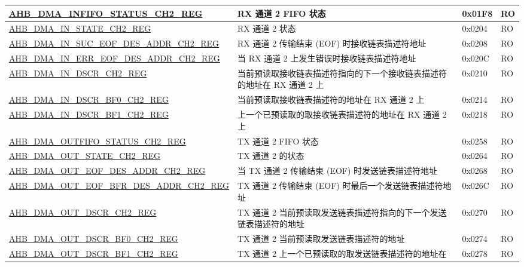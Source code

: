\begin{longtable}{ | p{8cm} | p{8cm} | p{1.3cm} | p{1.5cm} | }
\hyperref[regdesc:AHBDMAINFIFOSTATUSCHNREG]{AHB\_DMA\_INFIFO\_STATUS\_CH2\_REG} & RX 通道 2 FIFO 状态 & 0x01F8 & RO \\ \hline
\hyperref[regdesc:AHBDMAINSTATECHNREG]{AHB\_DMA\_IN\_STATE\_CH2\_REG} & RX 通道 2 状态 & 0x0204 & RO \\ \hline
\hyperref[regdesc:AHBDMAINSUCEOFDESADDRCHNREG]{AHB\_DMA\_IN\_SUC\_EOF\_DES\_ADDR\_CH2\_REG} & RX 通道 2 传输结束 (EOF) 时接收链表描述符地址 & 0x0208 & RO \\ \hline
\hyperref[regdesc:AHBDMAINERREOFDESADDRCHNREG]{AHB\_DMA\_IN\_ERR\_EOF\_DES\_ADDR\_CH2\_REG} & 当 RX 通道 2 上发生错误时接收链表描述符地址 & 0x020C & RO \\ \hline
\hyperref[regdesc:AHBDMAINDSCRCHNREG]{AHB\_DMA\_IN\_DSCR\_CH2\_REG} & 当前预读取接收链表描述符指向的下一个接收链表描述符的地址在 RX 通道 2 上 & 0x0210 & RO \\ \hline
\hyperref[regdesc:AHBDMAINDSCRBF0CHNREG]{AHB\_DMA\_IN\_DSCR\_BF0\_CH2\_REG} & 当前预读取接收链表描述符的地址在 RX 通道 2 上 & 0x0214 & RO \\ \hline
\hyperref[regdesc:AHBDMAINDSCRBF1CHNREG]{AHB\_DMA\_IN\_DSCR\_BF1\_CH2\_REG} & 上一个已预读取的取接收链表描述符的地址在 RX 通道 2 上 & 0x0218 & RO \\ \hline
\hyperref[regdesc:AHBDMAOUTFIFOSTATUSCHNREG]{AHB\_DMA\_OUTFIFO\_STATUS\_CH2\_REG} & TX 通道 2 FIFO 状态 & 0x0258 & RO \\ \hline
\hyperref[regdesc:AHBDMAOUTSTATECHNREG]{AHB\_DMA\_OUT\_STATE\_CH2\_REG} & TX 通道 2 的状态 & 0x0264 & RO \\ \hline
\hyperref[regdesc:AHBDMAOUTEOFDESADDRCHNREG]{AHB\_DMA\_OUT\_EOF\_DES\_ADDR\_CH2\_REG} & 当 TX 通道 2 传输结束 (EOF) 时发送链表描述符地址 & 0x0268 & RO \\ \hline
\hyperref[regdesc:AHBDMAOUTEOFBFRDESADDRCHNREG]{AHB\_DMA\_OUT\_EOF\_BFR\_DES\_ADDR\_CH2\_REG} & TX 通道 2 传输结束 (EOF) 时最后一个发送链表描述符地址 & 0x026C & RO \\ \hline
\hyperref[regdesc:AHBDMAOUTDSCRCHNREG]{AHB\_DMA\_OUT\_DSCR\_CH2\_REG} & TX 通道 2 当前预读取发送链表描述符指向的下一个发送链表描述符的地址 & 0x0270 & RO \\ \hline
\hyperref[regdesc:AHBDMAOUTDSCRBF0CHNREG]{AHB\_DMA\_OUT\_DSCR\_BF0\_CH2\_REG} & TX 通道 2 当前预读取发送链表描述符的地址 & 0x0274 & RO \\ \hline
\hyperref[regdesc:AHBDMAOUTDSCRBF1CHNREG]{AHB\_DMA\_OUT\_DSCR\_BF1\_CH2\_REG} & TX 通道 2 上一个已预读取的取发送链表描述符的地址在 & 0x0278 & RO \\ \hline

\end{longtable}
